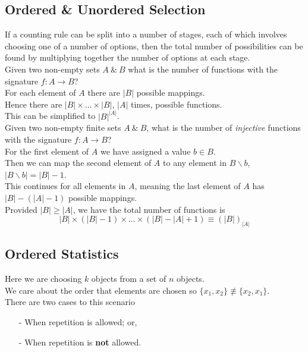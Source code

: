 \documentclass[11pt,a4paper]{article}
\begin{document}
\subsection{Ordered \& Unordered Selection}

If a counting rule can be split into a number of stages, each of which involves choosing one of a number of options, then the total number of possibilities can be found by multiplying together the number of options at each stage.\\

Given two non-empty sets $A\ \&\ B$ what is the number of functions with the signature $f:A\to B$?\\
For each element of $A$ there are $|B|$ possible mappings.\\
Hence there are $|B|\times\dots\times|B|$, $|A|$ times, possible functions.\\
This can be simplified to $|B|^{|A|}$.\\

Given two non-empty finite sets $A\ \&\ B$, what is the number of \textit{injective} functions with the signature $f:A\to B$?\\
For the first element of $A$ we have assigned a value $b\in B$.\\
Then we can map the second element of $A$ to any element in $B\backslash b$, $|B\backslash b|=|B|-1$.\\
This continues for all elements in $A$, meaning the last element of $A$ has $|B|-(|A|-1)$ possible mappings.\\
Provided $|B|\geq|A|$, we have the total number of functions is
$$|B|\times(|B|-1)\times\dots\times(|B|-|A|+1)\equiv(|B|)_{|A|}$$

\subsection{Ordered Statistics}

Here we are choosing $k$ objects from a set of $n$ objects.\\
We care about the order that elements are chosen so $\{x_1,x_2\}\not\equiv\{x_2,x_1\}$.\\
There are two cases to this scenario
\begin{itemize}
	\item[-] When repetition is allowed; or,
	\item[-] When repetition is \textbf{not} allowed.
\end{itemize}
\end{document}
